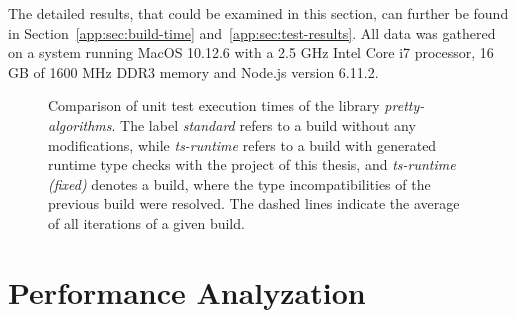 The detailed results, that could be examined in this section, can further be found in Section~\ref{app:sec:build-time} and~\ref{app:sec:test-results}. All data was gathered on a system running MacOS 10.12.6 with a 2.5 GHz Intel Core i7 processor, 16 GB of 1600 MHz DDR3 memory and Node.js version 6.11.2.
\begin{figure}
\centering

\caption{Comparison of unit test execution times of the library \emph{pretty-algorithms}. The label \emph{standard} refers to a build without any modifications, while \emph{ts-runtime} refers to a build with generated runtime type checks with the project of this thesis, and \emph{ts-runtime (fixed)} denotes a build, where the type incompatibilities of the previous build were resolved. The dashed lines indicate the average of all iterations of a given build.}
\label{fig:operational-test}
\end{figure}

\section{Performance Analyzation}
\label{sec:performance-analyzation}

